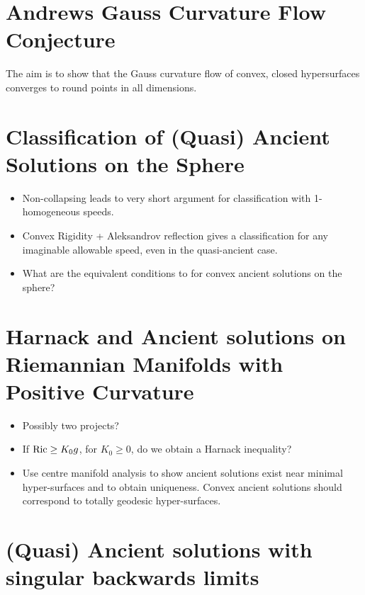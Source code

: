 \documentclass{amsart}
\begin{document}
\section{Andrews Gauss Curvature Flow Conjecture}

The aim is to show that the Gauss curvature flow of convex, closed hypersurfaces converges to round points in all dimensions.

\section{Classification of (Quasi) Ancient Solutions on the Sphere}

\begin{itemize}
\item Non-collapsing leads to very short argument for classification with 1-homogeneous speeds.
\item Convex Rigidity + Aleksandrov reflection gives a classification for any imaginable allowable speed, even in the quasi-ancient case.
\item What are the equivalent conditions to \cite{2014arXiv1405.7509H} for convex ancient solutions on the sphere?
\end{itemize}

\section{Harnack and Ancient solutions on Riemannian Manifolds with Positive Curvature}

\begin{itemize}
\item Possibly two projects?
\item If $\operatorname{\text{Ric}} \geq K_0 g$, for $K_0 \geq 0$, do we obtain a Harnack inequality?
\item Use centre manifold analysis to show ancient solutions exist near minimal hyper-surfaces and to obtain uniqueness. Convex ancient solutions should correspond to totally geodesic hyper-surfaces.
\end{itemize}

\section{(Quasi) Ancient solutions with singular backwards limits}
\end{document}
